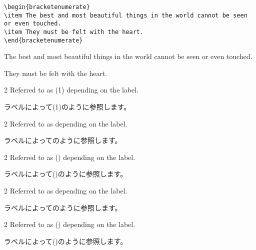 \documentclass[%
fleqn,%
paper=a4paper,%
fontsize=10pt,%
open_bracket_pos=zenkakunibu_nibu,%
hanging_punctuation,%
]%
{jlreq}
\newenvironment{translateing}%
{\begin{multicolpar}{2}}
{\end{multicolpar}\vspace{\baselineskip}}
\begin{document}
\begin{lstlisting}
\begin{bracketenumerate}
\item The best and most beautiful things in the world cannot be seen or even touched.
\item They must be felt with the heart.
\end{bracketenumerate}
\end{lstlisting}

\begin{macroexample}
\begin{bracketenumerate}
\item The best and most beautiful things in the world cannot be seen or even touched.
\item They must be felt with the heart.
\end{bracketenumerate}
\end{macroexample}


\begin{translateing}
Referred to as (1) depending on the label.

ラベルによって(1)のように参照します。
\end{translateing}


\begin{translateing}
Referred to as  depending on the label.

ラベルによってのように参照します。
\end{translateing}

\newpage
{}

\begin{translateing}
Referred to as () depending on the label.

ラベルによって()のように参照します。
\end{translateing}


\begin{translateing}
Referred to as  depending on the label.

ラベルによってのように参照します。
\end{translateing}


\begin{translateing}
Referred to as () depending on the label.

ラベルによって()のように参照します。
\end{translateing}
\end{document}
